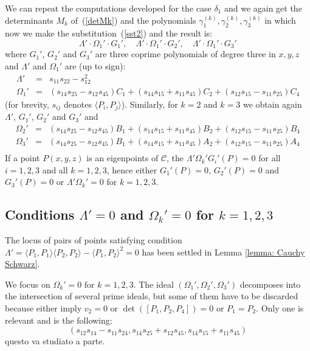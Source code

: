 \documentclass{amsart}
\theoremstyle{plain}
\theoremstyle{definition}
\newcommand{\scl}[2]{\langle #1, #2 \rangle}
\begin{document}
We can repeat the computations developed for the case $\delta_1$
and we again get the determinants $M_k$ of~(\ref{detMk}) and the polynomials
$\gamma_1^{(k)}, \gamma_2^{(k)}, \gamma_3^{(k)}$ in which now we make the
substitution~(\ref{sst2}) and the result is:
\[
\Lambda'\cdot \Omega_1' \cdot G_1', \quad
\Lambda'\cdot \Omega_1' \cdot G_2', \quad
\Lambda'\cdot \Omega_1' \cdot G_3'
\]
where $G_1'$, $G_2'$ and $G_3'$ are three coprime polynomials of degree three
in $x, y, z$ and $\Lambda'$ and $\Omega_1'$ are (up to sign):
\begin{eqnarray}
  \Lambda' & = & s_{11}s_{22}-s_{12}^2\\
  \Omega_1' & = & (s_{14}s_{25} - s_{12}s_{45})C_1
  + (s_{14}s_{15} + s_{11}s_{45})C_2 + (s_{12}s_{15} - s_{11}s_{25})C_4
\end{eqnarray}
(for brevity,  $s_{ij}$ denotes $\scl{P_i}{P_j}$).
Similarly, for $k = 2$ and $k = 3$ we obtain again $\Lambda'$, $G_1'$,
$G_2'$ and $G_3'$ and
\begin{eqnarray*}
  \Omega_2' & = & (s_{14}s_{25} - s_{12}s_{45})B_1
  + (s_{14}s_{15} + s_{11}s_{45})B_2 + (s_{12}s_{15} - s_{11}s_{25})B_4\\
  \Omega_3' & = & (s_{14}s_{25} - s_{12}s_{45})B_1
  + (s_{14}s_{15} + s_{11}s_{45})A_2 + (s_{12}s_{15} - s_{11}s_{25})A_4\\
\end{eqnarray*}
If a point $P(x, y, z)$ is an eigenpoints of $\mathcal{C}$, the
$\Lambda'\Omega_k'G_i'(P)=0$ for all $i=1, 2, 3$ and all $k = 1, 2, 3$,
hence either $G_1'(P) = 0$, $G_2'(P) = 0$ and $G_3'(P)=0$ or
$\Lambda'\Omega_k' = 0$ for $k = 1, 2, 3$.


\subsection{Conditions $\Lambda' =0$ and $\Omega_k' = 0$ for $k=1, 2, 3$}

The locus of pairs of points satisfying condition $\Lambda'=\scl{P_1}{P_1}\scl{P_2}{P_2}-\scl{P_1}{P_2}^2=0$ has been settled in Lemma \ref{lemma: Cauchy Schwarz}.
 
 We focus on $\Omega_k' = 0$ for $k=1, 2, 3$.
The ideal $(\Omega_1', \Omega_2', \Omega_3')$ decomposes into the intersection
of several prime ideals, but some of them have to be discarded because
either imply $v_2 = 0$ or $\det([P_1, P_2, P_4]) = 0$ or $P_1 = P_2$.
Only one is relevant
and is the following:
\[
(s_{12}s_{14} - s_{11}s_{24}, s_{14}s_{25} + s_{12}s_{45}, s_{14}s_{15} + s_{11}s_{45})
\]
questo va studiato a parte.
\end{document}
